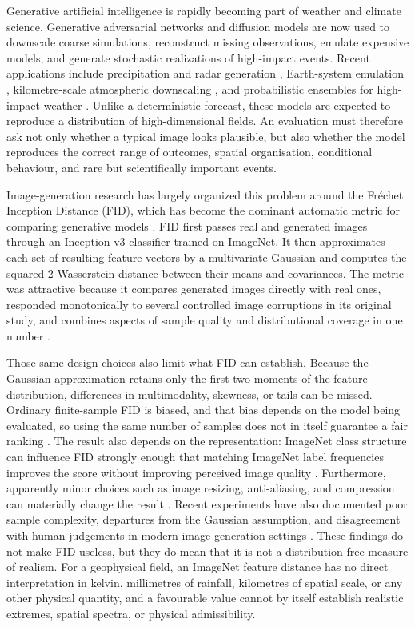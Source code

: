 \documentclass[gmd, manuscript]{copernicus}
\begin{document}
\introduction

Generative artificial intelligence is rapidly becoming part of weather and climate
science. Generative adversarial networks and diffusion models are now used to
downscale coarse simulations, reconstruct missing observations, emulate expensive
models, and generate stochastic realizations of high-impact events. Recent
applications include precipitation and radar generation
\citep{survey06,survey17,survey25}, Earth-system emulation
\citep{survey09,survey23}, kilometre-scale atmospheric downscaling
\citep{survey42,survey50}, and probabilistic ensembles for high-impact weather
\citep{survey07,survey43}. Unlike a deterministic forecast, these models are expected
to reproduce a distribution of high-dimensional fields. An evaluation must therefore
ask not only whether a typical image looks plausible, but also whether the model
reproduces the correct range of outcomes, spatial organisation, conditional
behaviour, and rare but scientifically important events.

Image-generation research has largely organized this problem around the Fr\'echet
Inception Distance (FID), which has become the dominant automatic metric for comparing
generative models \citep{Heusel2017,Kynkaanniemi2023}. FID first passes real and
generated images through an Inception-v3 classifier trained on ImageNet. It then
approximates each set of resulting feature vectors by a multivariate Gaussian and
computes the squared 2-Wasserstein distance between their means and covariances. The
metric was attractive because it compares generated images directly with real ones,
responded monotonically to several controlled image corruptions in its original
study, and combines aspects of sample quality and distributional coverage in one
number \citep{Heusel2017}.

Those same design choices also limit what FID can establish. Because the Gaussian
approximation retains only the first two moments of the feature distribution,
differences in multimodality, skewness, or tails can be missed. Ordinary finite-sample
FID is biased, and that bias depends on the model being evaluated, so using the same
number of samples does not in itself guarantee a fair ranking
\citep{Chong2020}. The result also depends on the representation: ImageNet class
structure can influence FID strongly enough that matching ImageNet label frequencies
improves the score without improving perceived image quality
\citep{Kynkaanniemi2023}. Furthermore, apparently minor choices such as image resizing,
anti-aliasing, and compression can materially change the result
\citep{Parmar2022}. Recent experiments have also documented poor sample complexity,
departures from the Gaussian assumption, and disagreement with human judgements in
modern image-generation settings \citep{Jayasumana2024}. These findings do not make
FID useless, but they do mean that it is not a distribution-free measure of realism.
For a geophysical field, an ImageNet feature distance has no direct interpretation in
kelvin, millimetres of rainfall, kilometres of spatial scale, or any other physical
quantity, and a favourable value cannot by itself establish realistic extremes,
spatial spectra, or physical admissibility.
\end{document}
